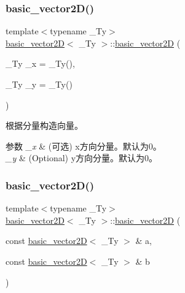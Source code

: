 \subsubsection{\texorpdfstring{basic\+\_\+vector2\+D()}{basic\_vector2D()}\hspace{0.1cm}{\footnotesize\ttfamily [1/2]}}
{\footnotesize\ttfamily template$<$typename \+\_\+\+Ty$>$ \\
\hyperlink{structbasic__vector2_d}{basic\+\_\+vector2D}$<$ \+\_\+\+Ty $>$\+::\hyperlink{structbasic__vector2_d}{basic\+\_\+vector2D} (\begin{DoxyParamCaption}\item[{\+\_\+\+Ty}]{\+\_\+x = {\ttfamily \+\_\+Ty()},  }\item[{\+\_\+\+Ty}]{\+\_\+y = {\ttfamily \+\_\+Ty()} }\end{DoxyParamCaption})\hspace{0.3cm}{\ttfamily [inline]}}



根据分量构造向量。 


\begin{DoxyParams}{参数}
{\em \+\_\+x} & (可选) x方向分量。默认为0。 \\
\hline
{\em \+\_\+y} & (Optional) y方向分量。默认为0。 \\
\hline
\end{DoxyParams}
\mbox{\label{structbasic__vector2_d_a348d37f966eeda40626112688649cb70}} 
\subsubsection{\texorpdfstring{basic\+\_\+vector2\+D()}{basic\_vector2D()}\hspace{0.1cm}{\footnotesize\ttfamily [2/2]}}
{\footnotesize\ttfamily template$<$typename \+\_\+\+Ty$>$ \\
\hyperlink{structbasic__vector2_d}{basic\+\_\+vector2D}$<$ \+\_\+\+Ty $>$\+::\hyperlink{structbasic__vector2_d}{basic\+\_\+vector2D} (\begin{DoxyParamCaption}\item[{const \hyperlink{structbasic__vector2_d}{basic\+\_\+vector2D}$<$ \+\_\+\+Ty $>$ \&}]{a,  }\item[{const \hyperlink{structbasic__vector2_d}{basic\+\_\+vector2D}$<$ \+\_\+\+Ty $>$ \&}]{b }\end{DoxyParamCaption})\hspace{0.3cm}{\ttfamily [inline]}}



